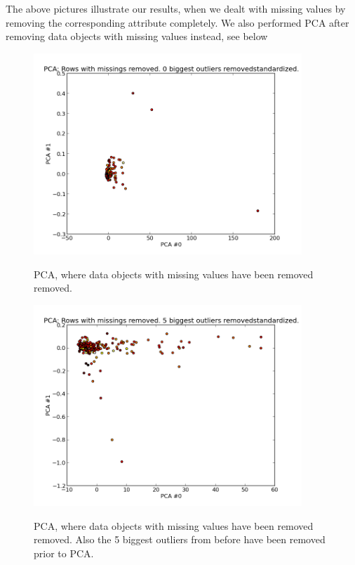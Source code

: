 The above pictures illustrate our results, when we dealt with missing values by removing the corresponding attribute completely. We also performed PCA after removing data objects with missing values instead, see below


\begin{figure}[H]
\centering
\includegraphics[width=0.9\textwidth]{pca/rows-with-missings-removed_0-biggest-outliers-removed_standrd_}
\label{fig:prenorm_attrrem_0out}
\caption{PCA, where data objects with missing values have been removed removed.}
\end{figure}
\begin{figure}[H]
\centering
\includegraphics[width=0.9\textwidth]{pca/rows-with-missings-removed_5-biggest-outliers-removed_standrd_}
\label{fig:prenorm_attrrem_0out}
\caption{PCA, where data objects with missing values have been removed removed. Also the 5 biggest outliers from before have been removed prior to PCA.}
\end{figure}

